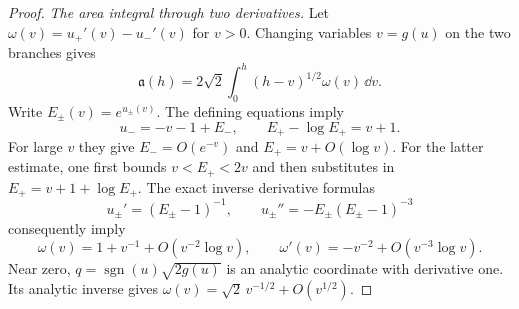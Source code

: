 \begin{proof}
\smallskip
\noindent\emph{The area integral through two derivatives.}
Let $\omega(v)=u_+'(v)-u_-'(v)$ for $v>0$. Changing variables
$v=g(u)$ on the two branches gives
\begin{equation}\label{rw:ect-abel-density}
 \mathfrak a(h)=2\sqrt2\int_0^h(h-v)^{1/2}\omega(v)\,\dd v.
\end{equation}
Write $E_\pm(v)=e^{u_\pm(v)}$. The defining equations imply
\[
 u_-=-v-1+E_-,\qquad E_+-\log E_+=v+1.
\]
For large $v$ they give $E_-=O(e^{-v})$ and
$E_+=v+O(\log v)$. For the latter estimate, one first bounds
$v<E_+<2v$ and then substitutes in $E_+=v+1+\log E_+$.
The exact inverse derivative formulas
\[
 u_\pm'=(E_\pm-1)^{-1},\qquad
 u_\pm''=-E_\pm(E_\pm-1)^{-3}
\]
consequently imply
\begin{equation}\label{rw:ect-density-tail}
 \omega(v)=1+v^{-1}+O(v^{-2}\log v),\qquad
 \omega'(v)=-v^{-2}+O(v^{-3}\log v).
\end{equation}
Near zero, $q=\operatorname{sgn}(u)\sqrt{2g(u)}$ is an analytic
coordinate with derivative one. Its analytic inverse gives
$\omega(v)=\sqrt2\,v^{-1/2}+O(v^{1/2})$.


\end{proof}
